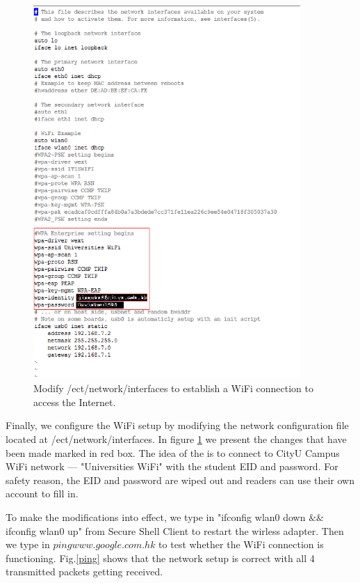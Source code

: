 \documentclass[12pt,journal,draftclsnofoot,onecolumn]{IEEEtran}
\begin{document}
\begin{figure}[htb]
	\centering
	\includegraphics[width=4in]{./figs/wifi.PNG}
	\caption{Modify /ect/network/interfaces to establish a WiFi connection to access the Internet.}
	\label{wifi}
\end{figure}

Finally, we configure the WiFi setup by modifying the network configuration file located at /ect/network/interfaces.
In figure \ref{wifi} we present the changes that have been made marked in red box. The idea of the is to connect to CityU Campus WiFi network --- "Universities WiFi" with the student EID and password. For safety reason, the EID and password are wiped out and readers can use their own account to fill in.



To make the modifications into effect, we type in "ifconfig wlan0 down $\&\&$ ifconfig wlan0 up" from Secure Shell Client to restart the wirless adapter. Then we type in $ping www.google.com.hk$ to test whether the WiFi connection is functioning. Fig.\ref{ping} shows that the network setup is correct with all 4 transmitted packets getting received.
\end{document}
